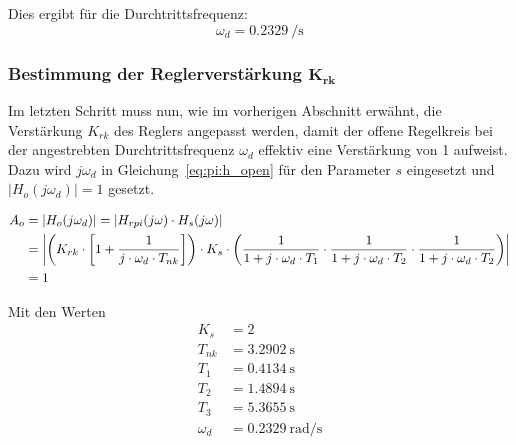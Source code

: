 Dies ergibt f\"ur die Durchtrittsfrequenz:
\begin{equation} \label{eq:pi:omega_d}
    \omega_d = \SI{0.2329}{\per\second}
\end{equation}


\subsubsection{Bestimmung der Reglerverst\"arkung $\mathbf{K_{rk}}$}

Im  letzten  Schritt   muss  nun,  wie  im   vorherigen  Abschnitt  erw\"ahnt,
die   Verst\"arkung  $K_{rk}$   des  Reglers   angepasst  werden,   damit  der
offene   Regelkreis  bei   der  angestrebten   Durchtrittsfrequenz  $\omega_d$
effektiv  eine  Verst\"arkung  von  1  aufweist.   Dazu  wird  $j\omega_d$  in
Gleichung~\ref{eq:pi:h_open}   f\"ur   den   Parameter  $s$   eingesetzt   und
$|H_o(j\omega_d)| = 1$ gesetzt.

\begin{gather} \label{eq:pi:A_o_set_to_one}
    \begin{split}
        A_o & = | H_o (j\omega_d) | = | H_{rpi} (j\omega) \cdot H_s (j\omega)| \\
            & = \abs*{
                    \bigg(
                        K_{rk} \cdot \biggl[ 1 + \frac{1}{j \cdot \omega_d \cdot T_{nk}} \biggr]
                    \bigg)
                    \cdot
                    K_s
                    \cdot
                    \bigg(
                            \frac{1}{1 + j \cdot \omega_d \cdot T_1}
                      \cdot \frac{1}{1 + j \cdot \omega_d \cdot T_2}
                      \cdot \frac{1}{1 + j \cdot \omega_d \cdot T_2}
                      \bigg)} \\
              & = 1
    \end{split}
\end{gather}

Mit den Werten
\begin{equation} \label{eq:pi:values}
    \begin{split}
        K_s      & = 2                    \\
        T_{nk}   & = \SI{3.2902}{\second} \\
        T_1      & = \SI{0.4134}{\second} \\
        T_2      & = \SI{1.4894}{\second} \\
        T_3      & = \SI{5.3655}{\second} \\
        \omega_d & = \SI{0.2329}{\radian\per\second}
    \end{split}
\end{equation}

